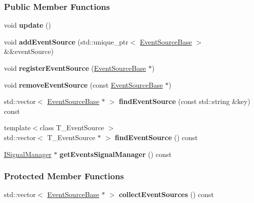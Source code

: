 \subsubsection*{Public Member Functions}
\begin{DoxyCompactItemize}
\item 
void {\bfseries update} ()\hypertarget{a00034_a5e321019b94d4be4e294951dc15d9bc8}{}\label{a00034_a5e321019b94d4be4e294951dc15d9bc8}

\item 
void {\bfseries add\+Event\+Source} (std\+::unique\+\_\+ptr$<$ \hyperlink{a00036}{Event\+Source\+Base} $>$ \&\&event\+Source)\hypertarget{a00034_ad8ae4d432415974ed273712d621b4b80}{}\label{a00034_ad8ae4d432415974ed273712d621b4b80}

\item 
void {\bfseries register\+Event\+Source} (\hyperlink{a00036}{Event\+Source\+Base} $\ast$)\hypertarget{a00034_a256dc81b8f38d55108fd146075975e76}{}\label{a00034_a256dc81b8f38d55108fd146075975e76}

\item 
void {\bfseries remove\+Event\+Source} (const \hyperlink{a00036}{Event\+Source\+Base} $\ast$)\hypertarget{a00034_ada92665ef93dca332fb60aad4397e741}{}\label{a00034_ada92665ef93dca332fb60aad4397e741}

\item 
std\+::vector$<$ \hyperlink{a00036}{Event\+Source\+Base} $\ast$ $>$ {\bfseries find\+Event\+Source} (const std\+::string \&key) const \hypertarget{a00034_a1973627817da759061278d41dfdf3596}{}\label{a00034_a1973627817da759061278d41dfdf3596}

\item 
{\footnotesize template$<$class T\+\_\+\+Event\+Source $>$ }\\std\+::vector$<$ T\+\_\+\+Event\+Source $\ast$ $>$ {\bfseries find\+Event\+Source} () const \hypertarget{a00034_a8a6707354f1d2dcce3c3c3e0d901c29e}{}\label{a00034_a8a6707354f1d2dcce3c3c3e0d901c29e}

\item 
\hyperlink{a00051}{I\+Signal\+Manager} $\ast$ {\bfseries get\+Events\+Signal\+Manager} () const \hypertarget{a00034_ada7ff964f3ee3c20a34324adc606872b}{}\label{a00034_ada7ff964f3ee3c20a34324adc606872b}

\end{DoxyCompactItemize}
\subsubsection*{Protected Member Functions}
\begin{DoxyCompactItemize}
\item 
std\+::vector$<$ \hyperlink{a00036}{Event\+Source\+Base} $\ast$ $>$ {\bfseries collect\+Event\+Sources} () const \hypertarget{a00034_a06d769343d241b827056389203e1dcb7}{}\label{a00034_a06d769343d241b827056389203e1dcb7}

\end{DoxyCompactItemize}


